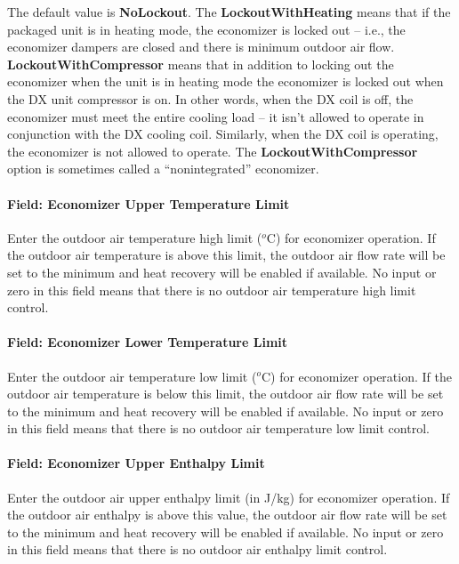 The default value is \textbf{NoLockout}. The \textbf{LockoutWithHeating} means that if the packaged unit is in heating mode, the economizer is locked out -- i.e., the economizer dampers are closed and there is minimum outdoor air flow. \textbf{LockoutWithCompressor} means that in addition to locking out the economizer when the unit is in heating mode the economizer is locked out when the DX unit compressor is on. In other words, when the DX coil is off, the economizer must meet the entire cooling load -- it isn't allowed to operate in conjunction with the DX cooling coil. Similarly, when the DX coil is operating, the economizer is not allowed to operate. The \textbf{LockoutWithCompressor} option is sometimes called a ``nonintegrated'' economizer.

\paragraph{Field: Economizer Upper Temperature Limit}\label{field-economizer-upper-temperature-limit}

Enter the outdoor air temperature high limit (\(^{o}\)C) for economizer operation. If the outdoor air temperature is above this limit, the outdoor air flow rate will be set to the minimum and heat recovery will be enabled if available. No input or zero in this field means that there is no outdoor air temperature high limit control.

\paragraph{Field: Economizer Lower Temperature Limit}\label{field-economizer-lower-temperature-limit}

Enter the outdoor air temperature low limit (\(^{o}\)C) for economizer operation. If the outdoor air temperature is below this limit, the outdoor air flow rate will be set to the minimum and heat recovery will be enabled if available. No input or zero in this field means that there is no outdoor air temperature low limit control.

\paragraph{Field: Economizer Upper Enthalpy Limit}\label{field-economizer-upper-enthalpy-limit}

Enter the outdoor air upper enthalpy limit (in J/kg) for economizer operation. If the outdoor air enthalpy is above this value, the outdoor air flow rate will be set to the minimum and heat recovery will be enabled if available. No input or zero in this field means that there is no outdoor air enthalpy limit control.

